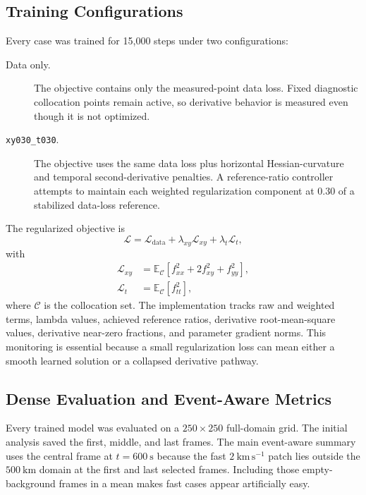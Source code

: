 \documentclass[11pt]{article}
\newcommand{\kmps}{\mathrm{km\,s^{-1}}}
\newcommand{\targetreg}{\texttt{xy030\_t030}}
\begin{document}
\subsection{Training Configurations}

Every case was trained for 15,000 steps under two configurations:
\begin{description}
  \item[Data only.] The objective contains only the measured-point data loss. Fixed diagnostic collocation
  points remain active, so derivative behavior is measured even though it is not optimized.
  \item[\targetreg.] The objective uses the same data loss plus horizontal Hessian-curvature and temporal
  second-derivative penalties. A reference-ratio controller attempts to maintain each weighted regularization
  component at 0.30 of a stabilized data-loss reference.
\end{description}

The regularized objective is
\begin{equation}
  \mathcal L = \mathcal L_{\mathrm{data}}
  + \lambda_{xy}\mathcal L_{xy}
  + \lambda_t\mathcal L_t,
\end{equation}
with
\begin{align}
  \mathcal L_{xy} &= \mathbb E_{\mathcal C}
  \left[f_{xx}^2 + 2f_{xy}^2 + f_{yy}^2\right], \\
  \mathcal L_t &= \mathbb E_{\mathcal C}\left[f_{tt}^2\right],
\end{align}
where $\mathcal C$ is the collocation set. The implementation tracks raw and weighted terms, lambda values,
achieved reference ratios, derivative root-mean-square values, derivative near-zero fractions, and parameter
gradient norms. This monitoring is essential because a small regularization loss can mean either a smooth
learned solution or a collapsed derivative pathway.

\subsection{Dense Evaluation and Event-Aware Metrics}

Every trained model was evaluated on a $250\times250$ full-domain grid. The initial analysis saved the first,
middle, and last frames. The main event-aware summary uses the central frame at $t=600~\mathrm{s}$ because the
fast $2~\kmps$ patch lies outside the $500~\mathrm{km}$ domain at the first and last selected frames. Including
those empty-background frames in a mean makes fast cases appear artificially easy.
\end{document}
